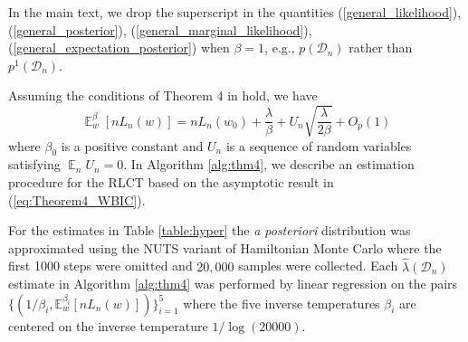\documentclass[11pt]{article}
\DeclareMathOperator*{\E}{\operatorname{\mathbb{E}}}
\numberwithin{equation}{section}
\theoremstyle{plain}
\theoremstyle{definition}
\begin{document}
In the main text, we drop the superscript in the quantities (\ref{general_likelihood}), (\ref{general_posterior}), (\ref{general_marginal_likelihood}), (\ref{general_expectation_posterior}) when $\beta = 1$, e.g., $p(\mathcal D_n)$ rather than $p^1(\mathcal D_n)$.


Assuming the conditions of Theorem 4 in \citet{watanabe_widely_2013} hold, we have
\begin{equation}
	{\E}_w^\beta [nL_n(w)] = nL_n(w_0) + \frac{\lambda }{\beta} + U_n \sqrt{\frac{\lambda}{2 \beta}} + O_p(1)
	\label{eq:Theorem4_WBIC}
\end{equation}
where $\beta_0$ is a positive constant and $U_n$ is a sequence of random variables satisfying ${\E}_n U_n = 0$. %
In Algorithm \ref{alg:thm4}, we describe an estimation procedure for the RLCT based on the asymptotic result in (\ref{eq:Theorem4_WBIC}).

For the estimates in Table \ref{table:hyper} the \emph{a posteriori} distribution was approximated using the NUTS variant of Hamiltonian Monte Carlo \citep{hoffman2014no} where the first 1000 steps were omitted and $20,000$ samples were collected.  Each $\hat \lambda(\mathcal D_n)$ estimate in Algorithm \ref{alg:thm4} was performed by linear regression on the pairs $\{ (1/\beta_i, \mathbb{E}^{\beta_i}_w[ nL_n(w) ] ) \}_{i=1}^5$ where the five inverse temperatures $\beta_i$ are centered on the inverse temperature $1/\log(20000)$.
\end{document}
